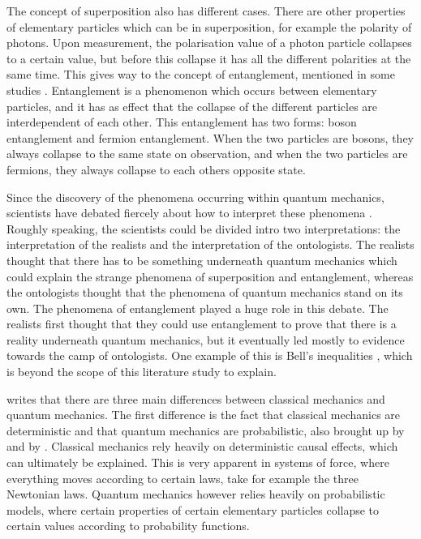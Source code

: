 \documentclass[11pt,twoside]{report} %
\begin{document}
The concept of superposition also has different cases. There are other properties of elementary particles which can be in superposition, for example the polarity of photons. Upon measurement, the polarisation value of a photon particle collapses to a certain value, but before this collapse it has all the different polarities at the same time. This gives way to the concept of entanglement, mentioned in some studies \cite{henriksen, hobson, kuttner}. Entanglement is a phenomenon which occurs between elementary particles, and it has as effect that the collapse of the different particles are interdependent of each other. This entanglement has two forms: boson entanglement and fermion entanglement. When the two particles are bosons, they always collapse to the same state on observation, and when the two particles are fermions, they always collapse to each others opposite state.

Since the discovery of the phenomena occurring within quantum mechanics, scientists have debated fiercely about how to interpret these phenomena \cite{barnes}. Roughly speaking, the scientists could be divided intro two interpretations: the interpretation of the realists and the interpretation of the ontologists. The realists thought that there has to be something underneath quantum mechanics which could explain the strange phenomena of superposition and entanglement, whereas the ontologists thought that the phenomena of quantum mechanics stand on its own. The phenomena of entanglement played a huge role in this debate. The realists first thought that they could use entanglement to prove that there is a reality underneath quantum mechanics, but it eventually led mostly to evidence towards the camp of ontologists. One example of this is Bell's inequalities \cite{kuttner, muller}, which is beyond the scope of this literature study to explain.

 writes that there are three main differences between classical mechanics and quantum mechanics. The first difference is the fact that classical mechanics are deterministic and that quantum mechanics are probabilistic, also brought up by  and by . Classical mechanics rely heavily on deterministic causal effects, which can ultimately be explained. This is very apparent in systems of force, where everything moves according to certain laws, take for example the three Newtonian laws. Quantum mechanics however relies heavily on probabilistic models, where certain properties of certain elementary particles collapse to certain values according to probability functions.
\end{document}
